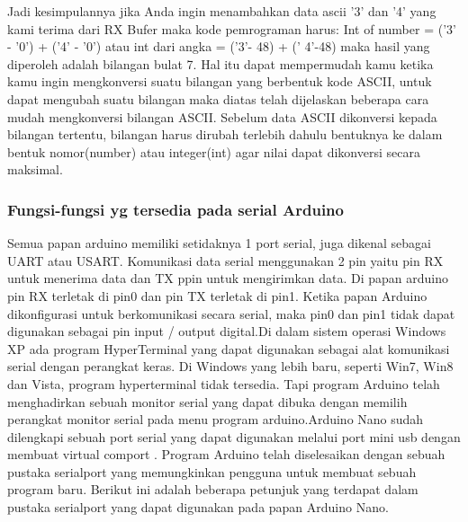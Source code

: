 Jadi kesimpulannya jika Anda ingin menambahkan data ascii '3' dan '4' yang kami terima dari RX Bufer maka kode pemrograman harus:
Int of number = ('3' - '0') + ('4' - '0') atau
int dari angka = ('3'- 48) + (' 4'-48) maka hasil yang diperoleh adalah bilangan bulat 7.
Hal itu dapat mempermudah kamu ketika kamu ingin mengkonversi suatu bilangan yang berbentuk kode ASCII, untuk dapat mengubah suatu bilangan maka diatas telah dijelaskan beberapa cara mudah mengkonversi bilangan ASCII. Sebelum data ASCII dikonversi kepada bilangan tertentu, bilangan harus dirubah terlebih dahulu bentuknya ke dalam bentuk nomor(number) atau integer(int) agar nilai dapat dikonversi secara maksimal.

\subsubsection {Fungsi-fungsi yg tersedia pada serial Arduino}
Semua papan arduino memiliki setidaknya 1 port serial, juga dikenal sebagai UART atau USART. Komunikasi data serial menggunakan 2 pin yaitu pin RX untuk menerima data dan TX ppin untuk mengirimkan data. Di papan arduino pin RX terletak di pin0 dan pin TX terletak di pin1. Ketika papan Arduino dikonfigurasi untuk berkomunikasi secara serial, maka pin0 dan pin1 tidak dapat digunakan sebagai pin input / output digital.Di dalam sistem operasi Windows XP ada program HyperTerminal yang dapat digunakan sebagai alat komunikasi serial dengan perangkat keras. Di Windows yang lebih baru, seperti Win7, Win8 dan Vista, program hyperterminal tidak tersedia. Tapi  program Arduino telah menghadirkan sebuah monitor serial yang dapat dibuka dengan memilih perangkat monitor serial pada menu program arduino.Arduino Nano sudah dilengkapi sebuah port serial yang dapat digunakan melalui port mini usb dengan membuat virtual comport .
Program Arduino telah diselesaikan dengan sebuah pustaka serialport yang memungkinkan pengguna untuk membuat sebuah program baru. Berikut ini adalah beberapa petunjuk yang terdapat dalam pustaka serialport yang dapat digunakan pada papan Arduino Nano.\cite{margolis2011arduino}
